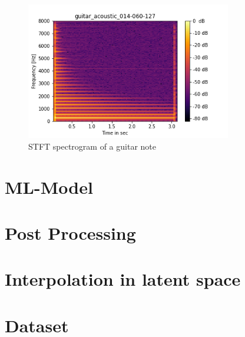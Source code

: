  \begin{figure}[htb!]
	\caption{STFT spectrogram of a guitar note}
	\label{fig:spectrogram}
	\centering
	\includegraphics[width=0.8\textwidth]{images/approach/guitar_acoustic_014-060-127.png}
\end{figure}



\section{ML-Model}
\label{sec:app_model}

\section{Post Processing}
\label{sec:app_sec_post_processing}

\section{Interpolation in latent space}
\label{sec:app_interpolation}

\section{Dataset}
\label{sec:app_dataset}